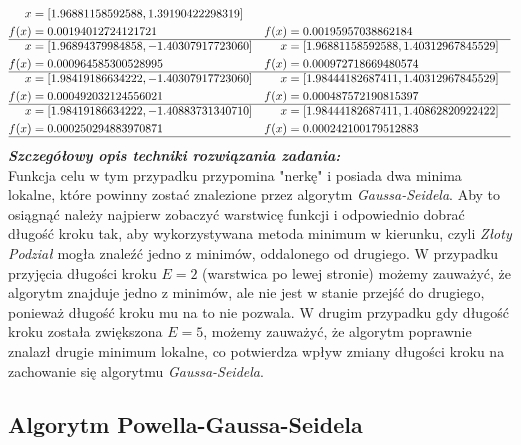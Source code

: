 \documentclass[a4paper,12pt]{article}
\begin{document}
\begin{align*}
x &= [1.96881158592588, 1.39190422298319] \\
f(x) &= 0.00194012724121721 & 
f(x) &= 0.00195957038862184 \\
\hline 
x &= [1.96894379984858, -1.40307917723060] & 
x &= [1.96881158592588, 1.40312967845529] \\
f(x) &= 0.000964585300528995 & 
f(x) &= 0.000972718669480574 \\
\hline 
x &= [1.98419186634222, -1.40307917723060] & 
x &= [1.98444182687411, 1.40312967845529] \\
f(x) &= 0.000492032124556021 & 
f(x) &= 0.000487572190815397 \\
\hline 
x &= [1.98419186634222, -1.40883731340710] & 
x &= [1.98444182687411, 1.40862820922422] \\
f(x) &= 0.000250294883970871 & 
f(x) &= 0.000242100179512883 \\
\hline
\end{align*}
\newline
\textbf{\textit{Szczegółowy opis techniki rozwiązania zadania:}} \\
Funkcja celu w tym przypadku przypomina "nerkę" i posiada dwa minima lokalne, które powinny zostać znalezione przez algorytm \textit{Gaussa-Seidela}. Aby to osiągnąć należy najpierw zobaczyć warstwicę funkcji i odpowiednio dobrać długość kroku tak, aby wykorzystywana metoda minimum w kierunku, czyli \textit{Złoty Podział} mogła znaleźć jedno z minimów, oddalonego od drugiego. W przypadku przyjęcia długości kroku $E = 2$ (warstwica po lewej stronie) możemy zauważyć, że algorytm znajduje jedno z minimów, ale nie jest w stanie przejść do drugiego, ponieważ długość kroku mu na to nie pozwala. W drugim przypadku gdy długość kroku została zwiększona $E = 5$, możemy zauważyć, że algorytm poprawnie znalazł drugie minimum lokalne, co potwierdza wpływ zmiany długości kroku na zachowanie się algorytmu \textit{Gaussa-Seidela}.

\newpage
\subsection{Algorytm Powella-Gaussa-Seidela}
\end{document}
